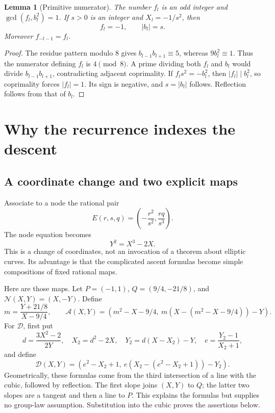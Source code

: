 \documentclass[11pt,a4paper]{article}
\newtheorem{lemma}[theorem]{Lemma}
\theoremstyle{definition}
\newcommand{\NN}{\mathcal N}
\renewcommand{\AA}{\mathcal A}
\newcommand{\DD}{\mathcal D}
\begin{document}
\begin{lemma}[Primitive numerator]\label{lem:primitive}
The number \(f_l\) is an odd integer and \(\gcd(f_l,b_l^2)=1\).
If \(s>0\) is an integer and \(X_l=-1/s^2\), then
\[
 f_l=-1,\qquad |b_l|=s.
\]
Moreover \(f_{-l-1}=f_l\).
\end{lemma}
\begin{proof}
The residue pattern modulo \(8\) gives
\(b_{l-1}b_{l+1}\equiv5\), whereas \(9b_l^2\equiv1\).
Thus the numerator defining \(f_l\) is \(4\pmod8\). A prime
dividing both \(f_l\) and \(b_l\) would divide
\(b_{l-1}b_{l+1}\), contradicting adjacent coprimality. If
\(f_ls^2=-b_l^2\), then \(|f_l|\mid b_l^2\), so coprimality
forces \(|f_l|=1\). Its sign is negative, and \(s=|b_l|\) follows.
Reflection follows from that of \(b_l\).
\end{proof}

\section{Why the recurrence indexes the descent}\label{sec:coordinates}

\subsection{A coordinate change and two explicit maps}

Associate to a node the rational pair
\begin{equation}\label{eq:nodepoint}
 E(r,s,q)=\left(-\frac{r^2}{s^2},\frac{rq}{s^3}\right).
\end{equation}
The node equation becomes
\begin{equation}\label{eq:curve}
 Y^2=X^3-2X.
\end{equation}
This is a change of coordinates, not an invocation of a theorem about
elliptic curves. Its advantage is that the complicated ascent formulas
become simple compositions of fixed rational maps.

Here are those maps. Let \(P=(-1,1)\), \(Q=(9/4,-21/8)\), and
\(\NN(X,Y)=(X,-Y)\). Define
\begin{equation}\label{eq:Amap}
 m=\frac{Y+21/8}{X-9/4},\qquad
 \AA(X,Y)=(m^2-X-9/4,\ m(X-(m^2-X-9/4))-Y).
\end{equation}
For \(\DD\), first put
\begin{equation}\label{eq:Dmap}
 d=\frac{3X^2-2}{2Y},\quad X_2=d^2-2X,\quad Y_2=d(X-X_2)-Y,
 \quad e=\frac{Y_2-1}{X_2+1},
\end{equation}
and define
\[
 \DD(X,Y)=(e^2-X_2+1,\ e(X_2-(e^2-X_2+1))-Y_2).
\]
Geometrically, these formulas come from the third intersection of a
line with the cubic, followed by reflection. The first slope joins
\((X,Y)\) to \(Q\); the latter two slopes are a tangent and then a
line to \(P\). This explains the formulas but supplies no group-law
assumption. Substitution into the cubic proves the assertions below.
\end{document}
